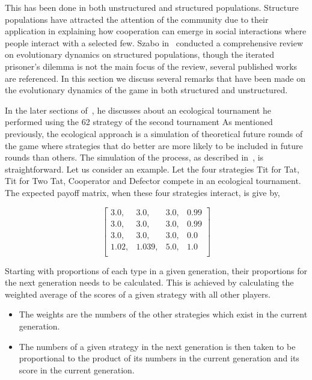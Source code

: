 \documentclass{article}
\theoremstyle{definition}
\begin{document}
This has been done in both unstructured and structured populations.
Structure populations have attracted the attention of the community due to their
application in explaining how cooperation can emerge in social interactions where
people interact with a selected few.
Szabo in~\cite{szabo2007}  conducted a comprehensive review on evolutionary
dynamics on structured populations, though the iterated prisoner's dilemma is not
the main focus of the review, several published works are referenced. In this
section we discuss several remarks that have been made on the evolutionary dynamics 
of the game in both structured and unstructured.


In the later sections of~\cite{Axelrod1980b}, he discusses about
an ecological tournament he performed using the 62 strategy of the second tournament
As mentioned previously, the ecological approach is a simulation of theoretical
future rounds of the game where strategies that do better are more likely to be
included in future rounds than others.
The simulation of the process, as described in~\cite{Axelrod1980b}, is straightforward.
Let us consider an example. Let the four strategies Tit for Tat, Tit for Two Tat,
Cooperator and Defector compete in an ecological tournament.
The expected payoff matrix, when these four strategies interact, is give by,

\[\begin{bmatrix}
    3.0,  & 3.0,  & 3.0, & 0.99 \\
    3.0,  & 3.0,  & 3.0, & 0.99 \\
    3.0,  & 3.0,  & 3.0, & 0.0  \\
    1.02, & 1.039,& 5.0, & 1.0 \\
\end{bmatrix}\]

Starting with proportions of each type in a given generation, their proportions
for the next generation needs to be calculated. This is achieved by calculating
the weighted average of the scores of a given strategy with all other players.


\begin{itemize}
    \item The weights are the numbers of the other strategies which
    exist in the current generation.
    \item The numbers of a given strategy in the next generation is then taken to
    be proportional to the product of its numbers in the current generation and
    its score in the current generation.
\end{itemize}
\end{document}
